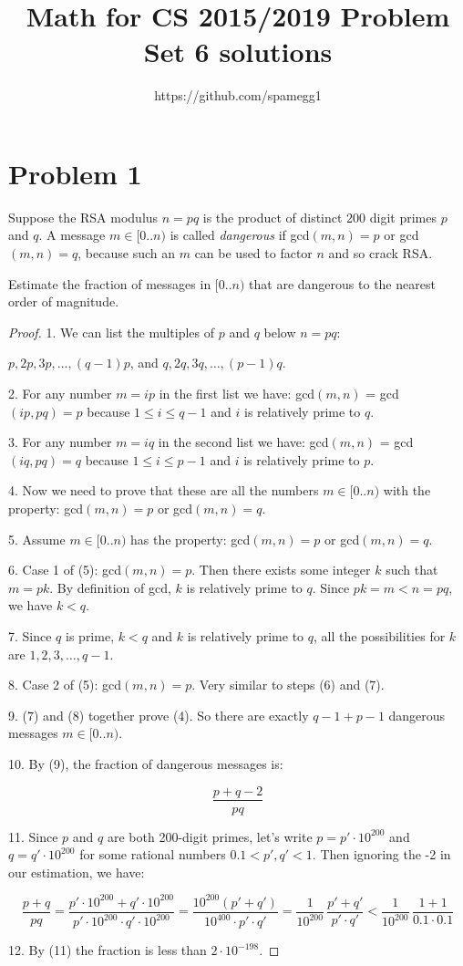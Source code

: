 \documentclass[14pt]{extarticle}
\title{Math for CS 2015/2019 Problem Set 6 solutions}
\author{https://github.com/spamegg1}
\begin{document}
\maketitle
\tableofcontents

\section{Problem 1}
Suppose the RSA modulus $n = pq$ is the product of distinct 200 digit primes $p$ and $q$. A message $m \in [0..n)$ is called {\it dangerous} if gcd$(m, n) = p$ or gcd$(m, n) = q$, because such an $m$ can be used to factor $n$ and so crack RSA.

Estimate the fraction of messages in $[0..n)$ that are dangerous to the nearest order of magnitude.

\begin{proof}
1. We can list the multiples of $p$ and $q$ below $n = pq$:

$p, 2p, 3p, \ldots, (q-1)p$, and $q, 2q, 3q, \ldots, (p-1)q$.

2. For any number $m = ip$ in the first list we have: gcd$(m, n)$ = gcd$(ip, pq) = p$ because $1 \leq i \leq q-1$ and $i$ is relatively prime to $q$.

3. For any number $m = iq$ in the second list we have: gcd$(m, n)$ = gcd$(iq, pq) = q$ because $1 \leq i \leq p-1$ and $i$ is relatively prime to $p$.

4. Now we need to prove that these are all the numbers $m \in [0..n)$ with the property: gcd$(m,n) = p$ or gcd$(m,n) = q$.

5. Assume $m \in [0..n)$ has the property: gcd$(m,n) = p$ or gcd$(m,n) = q$.

6. Case 1 of (5): gcd$(m,n) = p$. Then there exists some integer $k$ such that $m = pk$. By definition of gcd, $k$ is relatively prime to $q$. Since $pk = m < n = pq$, we have $k < q$.

7. Since $q$ is prime, $k < q$ and $k$ is relatively prime to $q$, all the possibilities for $k$ are $1, 2, 3, \ldots, q-1$.

8. Case 2 of (5): gcd$(m,n) = p$. Very similar to steps (6) and (7). 

9. (7) and (8) together prove (4). So there are exactly $q - 1 + p - 1$ dangerous messages $m \in [0..n)$.

10. By (9), the fraction of dangerous messages is:

$$
\frac{p+q-2}{pq}
$$

11. Since $p$ and $q$ are both 200-digit primes, let's write $p = p'\cdot 10^{200}$ and $q = q'\cdot 10^{200}$ for some rational numbers $0.1 < p', q' < 1$. Then ignoring the -2 in our estimation, we have:

$$
\frac{p+q}{pq} = \frac{p'\cdot 10^{200} + q'\cdot 10^{200}}{p'\cdot 10^{200} \cdot q'\cdot 10^{200}} = \frac{10^{200}(p' + q')}{10^{400}\cdot p'\cdot q'} = \frac{1}{10^{200}}\,\frac{p' + q'}{p'\cdot q'} < \frac{1}{10^{200}}\,\frac{1 + 1}{0.1 \cdot 0.1}
$$

12. By (11) the fraction is less than $2\cdot 10^{-198}$.
\end{proof}
\end{document}
